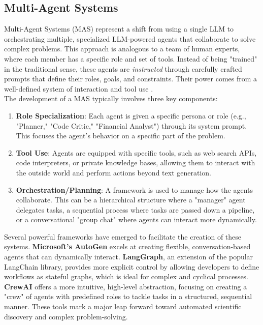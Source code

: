 \subsection{Multi-Agent Systems}
Multi-Agent Systems (MAS) represent a shift from using a single LLM to orchestrating multiple, specialized LLM-powered agents that collaborate to solve complex problems. This approach is analogous to a team of human experts, where each member has a specific role and set of tools. Instead of being "trained" in the traditional sense, these agents are \textit{instructed} through carefully crafted prompts that define their roles, goals, and constraints. Their power comes from a well-defined system of interaction and tool use \cite{han_llm_2025}.\\

The development of a MAS typically involves three key components:
\begin{enumerate}
    \item \textbf{Role Specialization}: Each agent is given a specific persona or role (e.g., "Planner," "Code Critic," "Financial Analyst") through its system prompt. This focuses the agent's behavior on a specific part of the problem.
    \item \textbf{Tool Use}: Agents are equipped with specific tools, such as web search APIs, code interpreters, or private knowledge bases, allowing them to interact with the outside world and perform actions beyond text generation.
    \item \textbf{Orchestration/Planning}: A framework is used to manage how the agents collaborate. This can be a hierarchical structure where a "manager" agent delegates tasks, a sequential process where tasks are passed down a pipeline, or a conversational "group chat" where agents can interact more dynamically.
\end{enumerate}

Several powerful frameworks have emerged to facilitate the creation of these systems. \textbf{Microsoft's AutoGen} \cite{wu_autogen_2023} excels at creating flexible, conversation-based agents that can dynamically interact. \textbf{LangGraph}, \cite{wang_agent_2024} an extension of the popular LangChain library, provides more explicit control by allowing developers to define workflows as stateful graphs, which is ideal for complex and cyclical processes. \textbf{CrewAI} offers a more intuitive, high-level abstraction, focusing on creating a "crew" of agents with predefined roles to tackle tasks in a structured, sequential manner. These tools mark a major leap forward toward automated scientific discovery and complex problem-solving. \\

